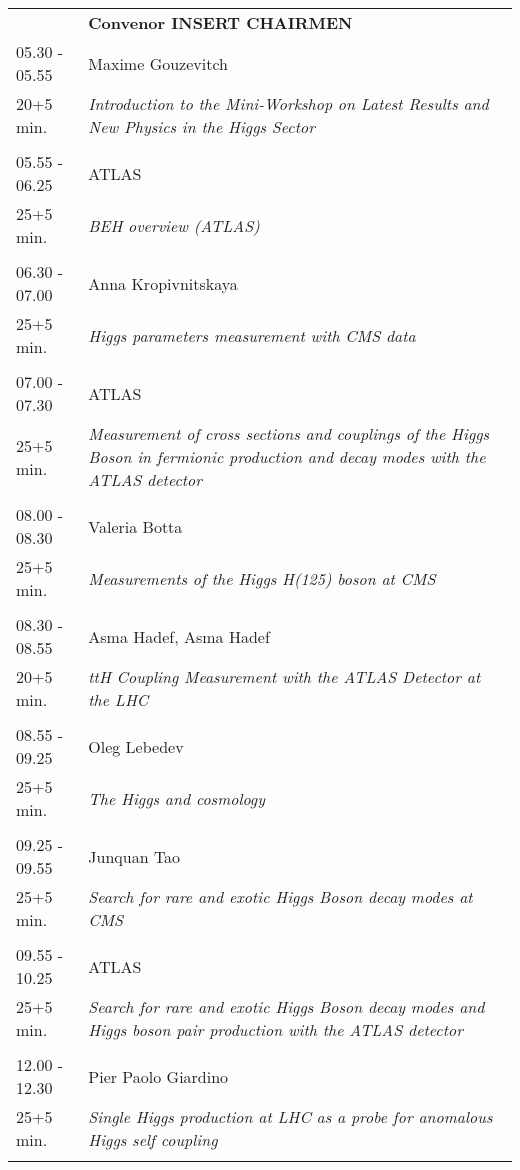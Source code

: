 \begin{longtable}{p{3cm}p{13cm}}
&\hfill {\bf Convenor INSERT CHAIRMEN }\\ 
05.30 - 05.55 & Maxime Gouzevitch\\ 
20+5 min. & {\it Introduction to the Mini-Workshop on Latest Results and New Physics in the Higgs Sector}\\ 
 & \\ 
05.55 - 06.25 & ATLAS\\ 
25+5 min. & {\it BEH overview (ATLAS)}\\ 
 & \\ 
06.30 - 07.00 & Anna Kropivnitskaya\\ 
25+5 min. & {\it Higgs parameters measurement with CMS data}\\ 
 & \\ 
07.00 - 07.30 & ATLAS\\ 
25+5 min. & {\it Measurement of cross sections and couplings of the Higgs Boson in fermionic production and decay modes with the ATLAS detector}\\ 
 & \\ 
08.00 - 08.30 & Valeria Botta\\ 
25+5 min. & {\it Measurements of the Higgs H(125) boson at CMS}\\ 
 & \\ 
08.30 - 08.55 & Asma Hadef, Asma Hadef\\ 
20+5 min. & {\it ttH Coupling Measurement with the ATLAS Detector at the LHC}\\ 
 & \\ 
08.55 - 09.25 & Oleg Lebedev\\ 
25+5 min. & {\it The Higgs and cosmology}\\ 
 & \\ 
09.25 - 09.55 & Junquan Tao\\ 
25+5 min. & {\it Search for rare and exotic Higgs Boson decay modes at CMS}\\ 
 & \\ 
09.55 - 10.25 & ATLAS\\ 
25+5 min. & {\it Search for rare and exotic Higgs Boson decay modes and Higgs boson pair production with the ATLAS detector}\\ 
 & \\ 
12.00 - 12.30 & Pier Paolo Giardino\\ 
25+5 min. & {\it Single Higgs production at LHC as a probe for anomalous Higgs self coupling}\\ 
 & \\ 

\end{longtable}
